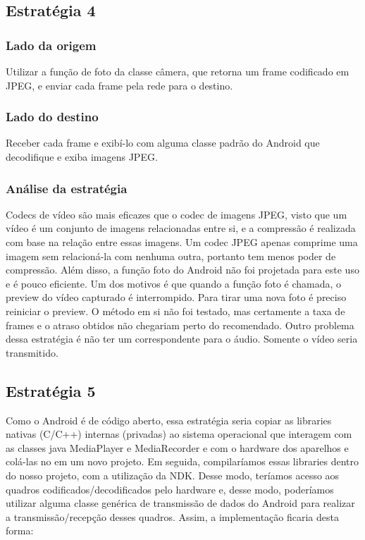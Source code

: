 \documentclass{acm_proc_article-sp}
\begin{document}
\subsection{Estratégia 4}

\subsubsection{Lado da origem}

Utilizar a função de foto da classe câmera, que retorna um frame codificado em JPEG, e enviar cada frame pela rede para o destino.

\subsubsection{Lado do destino}

Receber cada frame e exibí-lo com alguma classe padrão do Android que decodifique e exiba imagens JPEG.

\subsubsection{Análise da estratégia}

Codecs de vídeo são mais eficazes que o codec de imagens JPEG, visto que um vídeo é um conjunto de imagens relacionadas entre si, e a compressão é realizada com base na relação entre essas imagens. Um codec JPEG apenas comprime uma imagem sem relacioná-la com nenhuma outra, portanto tem menos poder de compressão. Além disso, a função foto do Android não foi projetada para este uso e é pouco eficiente. Um dos motivos é que quando a função foto é chamada, o preview do vídeo capturado é interrompido. Para tirar uma nova foto é preciso reiniciar o preview. O método em si não foi testado, mas certamente a taxa de frames e o atraso obtidos não chegariam perto do recomendado. Outro problema dessa estratégia é não ter um correspondente para o áudio. Somente o vídeo seria transmitido.

\subsection{Estratégia 5}
Como o Android é de código aberto, essa estratégia seria copiar as libraries nativas (C/C++) internas (privadas) ao sistema operacional que interagem com as classes java MediaPlayer e MediaRecorder e com o hardware dos aparelhos e colá-las no em um novo projeto. Em seguida, compilaríamos essas libraries dentro do nosso projeto, com a utilização da NDK. Desse modo, teríamos acesso aos quadros codificados/decodificados pelo hardware e, desse modo, poderíamos utilizar alguma classe genérica de transmissão de dados do Android para realizar a transmissão/recepção desses quadros. Assim, a implementação ficaria desta forma:
\end{document}
